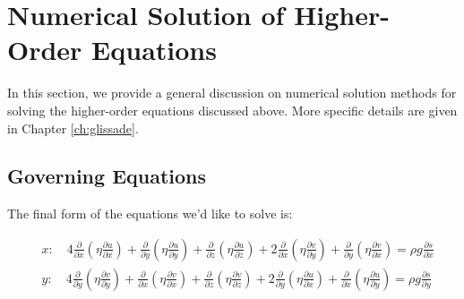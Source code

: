
\section{Numerical Solution of Higher-Order Equations}
\label{sc:higher-order-numerics}

In this section, we provide a general discussion on numerical solution methods for solving the higher-order equations discussed above. More specific details are given in Chapter \ref{ch:glissade}.

\subsection{Governing Equations}
The final form of the equations we'd like to solve is:
 

\begin{align*}
 & x: \quad 4\frac{\partial }{\partial x}\left( \eta \frac{\partial u}{\partial x} \right)+\frac{\partial }{\partial y}\left( \eta \frac{\partial u}{\partial y} \right)+\frac{\partial }{\partial z}\left( \eta \frac{\partial u}{\partial z} \right) + 2\frac{\partial }{\partial x}\left( \eta \frac{\partial v}{\partial y} \right)+\frac{\partial }{\partial y}\left( \eta \frac{\partial v}{\partial x} \right) = \rho g\frac{\partial s}{\partial x} \\ 
 & y: \quad 4\frac{\partial }{\partial y}\left( \eta \frac{\partial v}{\partial y} \right)+\frac{\partial }{\partial x}\left( \eta \frac{\partial v}{\partial x} \right)+\frac{\partial }{\partial z}\left( \eta \frac{\partial v}{\partial z} \right) + 2\frac{\partial }{\partial y}\left( \eta \frac{\partial u}{\partial x} \right)+\frac{\partial }{\partial x}\left( \eta \frac{\partial u}{\partial y} \right) = \rho g\frac{\partial s}{\partial y} \\ 
\end{align*}

